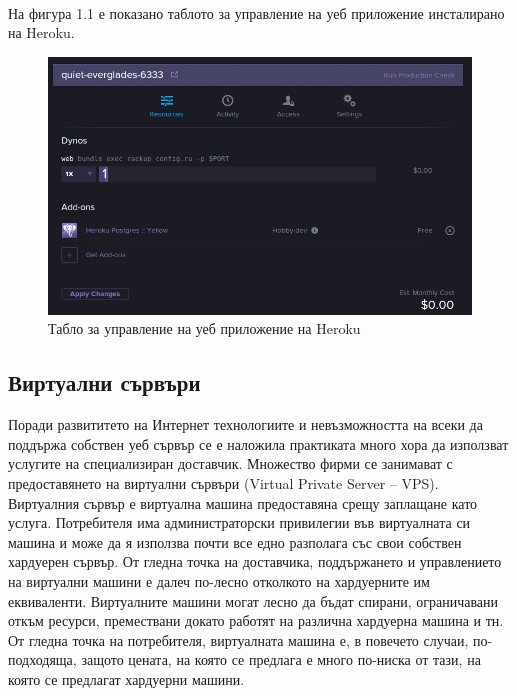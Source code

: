 \documentclass[pdftex,14pt,a4paper]{extreport}
\begin{document}
\paragraph {}

На фигура 1.1 е показано таблото за управление на уеб приложение инсталирано на Heroku.
\begin{figure}[h]
  \centering
  \includegraphics [scale=0.5]{./heroku_dashboard}
  \caption {Табло за управление на уеб приложение на Heroku}
\end{figure}
\subsection {Виртуални сървъри}
Поради развититето на Интернет технологиите и невъзможността на всеки да поддържа собствен уеб сървър се е наложила практиката много хора да използват услугите на специализиран доставчик. Множество фирми се занимават с предоставянето на виртуални сървъри (Virtual Private Server – VPS). Виртуалния сървър е виртуална машина предоставяна срещу заплащане като услуга. Потребителя има администраторски привилегии във виртуалната си машина и може да я използва почти все едно разполага със свои собствен хардуерен сървър. От гледна точка на доставчика, поддържането и управлението на виртуални машини е далеч по-лесно отколкото на хардуерните им еквиваленти. Виртуалните машини могат лесно да бъдат спирани, ограничавани откъм ресурси, премествани докато работят на различна хардуерна машина и тн. От гледна точка на потребителя, виртуалната машина е, в повечето случаи, по-подходяща, защото цената, на която се предлага е много по-ниска от тази, на която се предлагат хардуерни машини.
\end{document}

